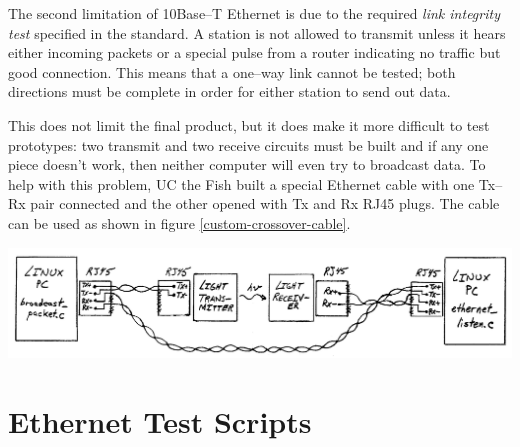 \documentclass{article}
\begin{document}
The second limitation of 10Base--T Ethernet is due to the required \textit{link integrity test}
specified in the standard.
A station is not allowed to transmit unless it hears either incoming packets or
a special pulse from a router indicating no traffic but good connection.
This means that a one--way link cannot be tested; both directions must be complete
in order for either station to send out data.

This does not limit the final product, but it does make it more difficult to test
prototypes: two transmit and two receive circuits must be built and if
any one piece doesn't work, then neither computer will even try to broadcast data.
To help with this problem, UC the Fish built a special Ethernet cable with
one Tx--Rx pair connected and the other opened with Tx and Rx RJ45 plugs.
The cable can be used as shown in figure \ref{custom-crossover-cable}.

\begin{center}
	\includegraphics[width=1\textwidth]{custom_crossover_cable.png}
	\label{custom-crossover-cable}
\end{center}

\appendix

\pagebreak
\section{Ethernet Test Scripts}



\pagebreak


\pagebreak

\end{document}
